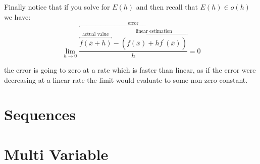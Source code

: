 \documentclass{standalone}
\begin{document}
Finally notice that if you solve for $ E\left( h \right) $ and then recall that $ E\left( h \right) \in o\left( h \right)  $ we have:
\[
\lim_{ h \to 0 } \frac{ \overbracket{\overbracket{f\left( \overline{x} +  h \right)}^{~\text{actual value}~ } -  \overbracket{\left( f\left( \overline{x}  \right)  +  h f ^{ \prime  } \left( \overline{x}  \right) \right)}^{~\text{linear estimation}~  }}^{~\text{error}~  } }{h}= 0
\]

the error is going to zero at a rate which is faster than linear, as if the error were decreasing at a linear rate the limit would evaluate to some non-zero constant.

\newpage
\section{Sequences}





\section{Multi Variable}


\end{document}
